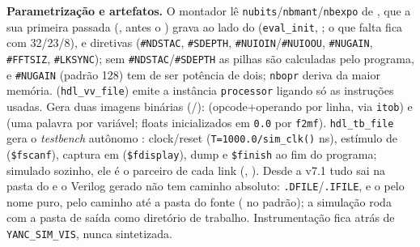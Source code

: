 \textbf{Parametrização e artefatos.} O montador lê \lstinline|nubits|/\lstinline|nbmant|/\lstinline|nbexpo| de , que a sua primeira passada (, antes o ) grava ao lado do  (\lstinline|eval_init|, ; o que falta fica com 32/23/8), e diretivas (\lstinline|#NDSTAC|, \lstinline|#SDEPTH|, \lstinline|#NUIOIN|/\lstinline|#NUIOOU|, \lstinline|#NUGAIN|, \lstinline|#FFTSIZ|, \lstinline|#LKSYNC|); sem \lstinline|#NDSTAC|/\lstinline|#SDEPTH| as pilhas são calculadas pelo programa, e \lstinline|#NUGAIN| (padrão 128) tem de ser potência de dois; \lstinline|nbopr| deriva da maior memória.  (\lstinline|hdl_vv_file|) emite a instância \lstinline|processor| ligando só as instruções usadas. Gera duas imagens binárias (/):  (opcode+operando por linha, via \lstinline|itob|) e  (uma palavra por variável; floats inicializados em \lstinline|0.0| por \lstinline|f2mf|). \lstinline|hdl_tb_file| gera o \emph{testbench} autônomo : clock/reset (\lstinline|T=1000.0/sim_clk()| ns), estímulo de  (\lstinline|$fscanf|), captura em  (\lstinline|$fdisplay|), dump  e \lstinline|$finish| ao fim do programa; simulado sozinho, ele é o parceiro de cada link (, ). Desde a v7.1 tudo sai na pasta do  e o Verilog gerado não tem caminho absoluto: \lstinline|.DFILE|/\lstinline|.IFILE|,  e o  pelo nome puro,  pelo caminho até a pasta do fonte ( no padrão); a simulação roda com a pasta de saída como diretório de trabalho. Instrumentação fica atrás de \lstinline|YANC_SIM_VIS|, nunca sintetizada.
